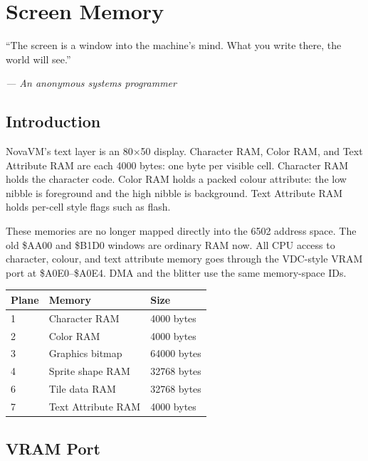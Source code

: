 \chapter{Screen Memory}

\epigraph{``The screen is a window into the machine's mind. What you write
there, the world will see.''}{\textit{--- An anonymous systems programmer}}

\section*{Introduction}

NovaVM's text layer is an 80$\times$50 display. Character RAM, Color RAM,
and Text Attribute RAM are each 4000 bytes: one byte per visible cell.
Character RAM holds the character code. Color RAM holds a packed colour
attribute: the low nibble is foreground and the high nibble is background.
Text Attribute RAM holds per-cell style flags such as flash.

These memories are no longer mapped directly into the 6502 address space.
The old \$AA00 and \$B1D0 windows are ordinary RAM now. All CPU access to
character, colour, and text attribute memory goes through the VDC-style VRAM port at
\$A0E0--\$A0E4. DMA and the blitter use the same memory-space IDs.

\begin{center}
\small
\begin{tabular}{@{}lll@{}}
\toprule
\textbf{Plane} & \textbf{Memory} & \textbf{Size} \\
\midrule
1 & Character RAM & 4000 bytes \\
2 & Color RAM & 4000 bytes \\
3 & Graphics bitmap & 64000 bytes \\
4 & Sprite shape RAM & 32768 bytes \\
6 & Tile data RAM & 32768 bytes \\
7 & Text Attribute RAM & 4000 bytes \\
\bottomrule
\end{tabular}
\end{center}

\section{VRAM Port}
\label{sec:charram}

